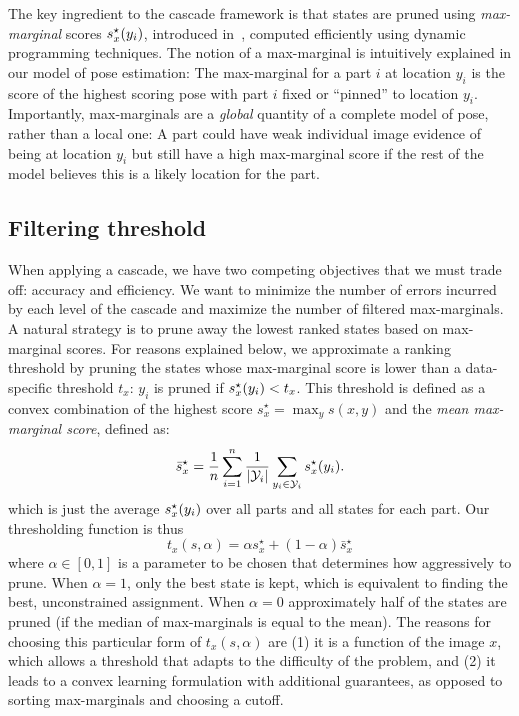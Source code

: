 The key ingredient to the cascade framework is that states are pruned using 
{\em max-marginal} scores $s^\star_x(y_i)$, introduced in~, 
computed efficiently using dynamic programming techniques.  The notion of a 
max-marginal is intuitively explained in our model of pose estimation:  The 
max-marginal for a part $i$ at location $y_i$ is the score of the highest 
scoring pose with part $i$ fixed or ``pinned'' to location $y_i$. Importantly, 
max-marginals are a {\em global} quantity of a complete model of pose, rather 
than a local one: A part could have weak individual image evidence of being at 
location $y_i$ but still have a high max-marginal score if the rest of the 
model believes this is a likely location for the part. 

\subsection{Filtering threshold}\label{sec:cps-thresh}

When applying a cascade, we have two competing objectives that we must trade 
off: accuracy and efficiency. We want to minimize the number of errors incurred 
by each level of the cascade  and maximize the number of filtered 
max-marginals.  A natural strategy is to prune away the lowest ranked states 
based on max-marginal scores.   For reasons explained below, we approximate a 
ranking threshold by pruning the states whose max-marginal score is lower than 
a data-specific threshold $t_x$: $y_i$ is pruned if $s^\star_x(y_i) < t_x$.  This 
threshold is defined as a convex combination of the highest score
$s^\star_x = \max_y s(x,y)$ and the {\em mean max-marginal score}, defined as:
\begin{equation}
\bar{s}^\star_x = \frac{1}{n} \sum_{i=1}^n \frac{1}{|\mathcal{Y}_i|} \sum_{y_i \in 
\mathcal{Y}_i} s^\star_x(y_i).
\end{equation}
which is just the average $s^\star_x(y_i)$ over all parts and all states for each part.  Our thresholding function is thus
\begin{equation}
t_x(s,\alpha) = \alpha s^\star_x + (1-\alpha)\bar{s}^\star_x
\end{equation}
where $\alpha\in[0,1]$ is a parameter to be chosen that 
determines how aggressively to prune. When $\alpha = 1$, only the best state is 
kept, which is equivalent to finding the best, unconstrained assignment.  When $\alpha = 0$ 
approximately half of the states are pruned (if the median of max-marginals is 
equal to the mean).  The reasons for choosing this particular form of $t_x(s,\alpha)$ are (1) it is a 
function of the image $x$, which allows a threshold that adapts to the 
difficulty of the problem, and (2) it leads to a convex learning formulation 
with additional guarantees, as opposed to sorting max-marginals and choosing a 
cutoff.

